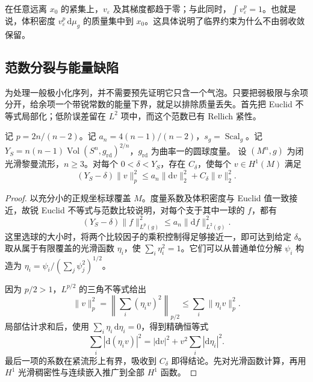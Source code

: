 在任意远离 \(x_0\) 的紧集上，\(v_\varepsilon\) 及其梯度都趋于零；与此同时，\(\int v_\varepsilon^p=1\)。也就是说，体积密度 \(v_\varepsilon^p\,\mathrm d\mu_g\) 的质量集中到 \(x_0\)。这具体说明了临界约束为什么不由弱收敛保留。

\subsection{范数分裂与能量缺陷}
\label{g3:subsec:2404:02}
为处理一般极小化序列，并不需要预先证明它只含一个气泡。只要把弱极限与余项分开，给余项一个带锐常数的能量下界，就足以排除质量丢失。首先把 Euclid 不等式局部化；低阶误差留在 \(L^2\) 项中，而这个范数已有 Rellich 紧性。

\begin{lemma}\label{g3:lem:yamabe-near-sharp-sobolev}
	记 \(p=2n/(n-2)\)。记 \(a_n=4(n-1)/(n-2)\)，\(s_g=\operatorname{Scal}_g\)。记 \(Y_S=n(n-1)\operatorname{Vol}(S^n,g_{\mathrm{rd}})^{2/n}\)，\(g_{\mathrm{rd}}\) 为曲率一的圆球度量。
	设 \((M^n,g)\) 为闭光滑黎曼流形，\(n\ge3\)。对每个 \(0<\delta<Y_S\)，存在 \(C_\delta\)，使每个 \(v\in H^1(M)\) 满足
	\begin{equation}\label{g3:eq:yamabe-near-sharp-sobolev}
		(Y_S-\delta)\|v\|_p^2
		\le a_n\|\mathrm dv\|_2^2+C_\delta\|v\|_2^2.
	\end{equation}
\end{lemma}
\begin{proof}
	以充分小的正规坐标球覆盖 \(M\)。度量系数及体积密度与 Euclid 值一致接近，故锐 Euclid 不等式与范数比较说明，对每个支于其中一球的 \(f\)，都有
	\[
		(Y_S-\delta)\|f\|_{L^p(g)}^2\le a_n\|\mathrm df\|_{L^2(g)}^2.
	\]
	这里选球的大小时，将两个比较因子的乘积控制得足够接近一，即可达到给定 \(\delta\)。取从属于有限覆盖的光滑函数 \(\eta_i\)，使 \(\sum_i\eta_i^2=1\)。它们可以从普通单位分解 \(\psi_i\) 构造为 \(\eta_i=\psi_i/(\sum_j\psi_j^2)^{1/2}\)。

	因为 \(p/2>1\)，\(L^{p/2}\) 的三角不等式给出
	\[
		\|v\|_p^2
		=\left\|\sum_i(\eta_iv)^2\right\|_{p/2}
		\le\sum_i\|\eta_iv\|_p^2.
	\]
	局部估计求和后，使用 \(\sum_i\eta_i\,\mathrm d\eta_i=0\)，得到精确恒等式
	\[
		\sum_i|\mathrm d(\eta_iv)|^2
		=|\mathrm dv|^2+v^2\sum_i|\mathrm d\eta_i|^2.
	\]
	最后一项的系数在紧流形上有界，吸收到 \(C_\delta\) 即得结论。先对光滑函数计算，再用 \(H^1\) 光滑稠密性与连续嵌入推广到全部 \(H^1\) 函数。
\end{proof}

